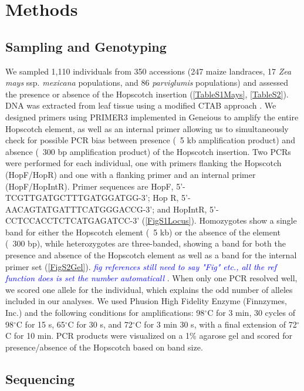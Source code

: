 \documentclass[12pt]{article}
\newcommand{\jri}[1]{\textcolor{blue}{ \emph{\scriptsize  #1}} }
\begin{document}
\section*{Methods}

\subsection*{Sampling and Genotyping}

We sampled 1,110 individuals from 350 accessions (247 maize landraces, 17 \emph{Zea mays} ssp. \emph{mexicana} populations, and 86 \emph{parviglumis} populations) and assessed the presence or absence of the Hopscotch insertion (\ref{TableS1Mays}, \ref{TableS2}). DNA was extracted from leaf tissue using a modified CTAB approach \citep{DoyleDoyle1990, Maloof1984}. We designed primers using PRIMER3 \citep{RozenSkaletsky2000} implemented in Geneious \cite{Kearse2012} to amplify the entire Hopscotch element, as well as an internal primer allowing us to simultaneously check for possible PCR bias between presence (~5 kb amplification product) and absence (~300 bp amplification product) of the Hopscotch insertion. Two PCRs were performed for each individual, one with primers flanking the Hopscotch (HopF/HopR) and one with a flanking primer and an internal primer (HopF/HopIntR). Primer sequences are HopF, {\small 5'-TCGTTGATGCTTTGATGGATGG-3'}; 
Hop R, {\small 5'-AACAGTATGATTTCATGGGACCG-3'}; and HopIntR, 5'-{\small CCTCCACCTCTCATGAGATCC-3'} (\ref{FigS1Locus}). Homozygotes show a single band for either the Hopscotch element (~5 kb) or the absence of the element (~300 bp), while heterozygotes are three-banded, showing a band for both the presence and absence of the Hopscotch element as well as a band for the internal primer set (\ref{FigS2Gel}). \jri{fig references still need to say "Fig" etc., all the ref function does is set the number automaticall}. When only one PCR resolved well, we scored one allele for the individual, which explains the odd number of alleles included in our analyses. We used Phusion High Fidelity Enzyme (Finnzymes, Inc.) and the following conditions for amplifications: 98$^{\circ}$C for 3 min, 30 cycles of 98$^{\circ}$C for 15 s, 65$^{\circ}$C for 30 s, and 72$^{\circ}$C for 3 min 30 s, with a final extension of 72$^{\circ}$C for 10 min. PCR products were visualized on a 1\% agarose gel and scored for presence/absence of the Hopscotch based on band size.

\subsection*{Sequencing}
\end{document}
